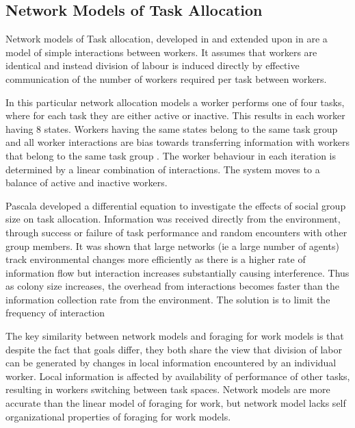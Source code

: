                                    
\subsection{Network Models of Task Allocation}

Network models of Task allocation, developed in \cite{gordon1992parallel} and extended upon in \cite{pacala1996effects} are a model of simple interactions between workers. It assumes that workers are identical and instead division of labour is induced directly by effective communication of the number of workers required per task between workers. 
 
In this particular network allocation models a worker performs one of four tasks, where for each task they are either active or inactive. This results in each worker having 8 states. Workers having the same states belong to the same task group and all worker interactions are bias towards transferring information with workers that belong to the same task group \cite{gordon1992parallel}. The worker behaviour in each iteration is determined by a linear combination of interactions. The system moves to a balance of active and inactive workers. 

Pascala \cite{pacala1996effects} developed a differential equation to investigate the effects of social group size on task allocation. Information was received directly from the environment, through success or failure of task performance and random encounters with other group members. It was shown that large networks (ie a large number of agents) track environmental changes more efficiently as there is a higher rate of information flow but interaction increases substantially causing interference. Thus as colony size increases, the overhead from interactions becomes faster than the information collection rate from the environment. The solution is to limit the frequency of interaction \cite{pacala1996effects}

The key similarity between network models and foraging for work models is that despite the fact that goals differ, they both share the view that division of labor can be generated by changes in local information encountered by an individual worker. Local information is affected by availability of performance of other tasks, resulting in workers switching between task spaces. Network models are more accurate than the linear model of foraging for work, but network model lacks self organizational properties of foraging for work models.

